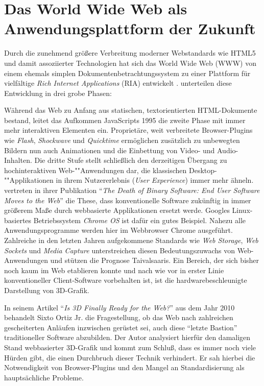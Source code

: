 \chapter{Das World Wide Web als Anwendungsplattform der Zukunft}
\label{CHAP:INTRODUCTION}

Durch die zunehmend größere Verbreitung moderner Webstandards wie HTML5 und damit assoziierter Technologien hat sich das World Wide Web (WWW) von einem ehemals simplen Dokumentenbetrachtungssystem zu einer Plattform für vielfältige \emph{Rich Internet Applications} (RIA) entwickelt \autocite{Taivalsaari:2001:Saga_continues}. \textcite{Anttonen:2011:TWR:1982185.1982357} unterteilen diese Entwicklung in drei grobe Phasen:

Während das Web zu Anfang aus statischen, textorientierten HTML-Dokumente bestand, leitet das Aufkommen JavaScripts 1995 die zweite Phase mit immer mehr interaktiven Elementen ein. Proprietäre, weit verbreitete Browser-Plugins wie \emph{Flash}, \emph{Shockwave} und \emph{Quicktime} ermöglichen zusätzlich zu unbewegten Bildern nun auch Animationen und die Einbettung von Video- und Audio-Inhalten.\newline
Die dritte Stufe stellt schließlich den derzeitigen Übergang zu hochinteraktiven Web-""Anwendungen dar, die klassischen Desktop-""Applikationen in ihrem Nutzererlebnis (\emph{User Experience}) immer mehr ähneln.
\textcite{Taivalsaari:2011:Death_of_Binary_Software} vertreten in ihrer Publikation \enquote{\emph{The Death of Binary Software: End User Software Moves to the Web}} die These, dass konventionelle Software zukünftig in immer größerem Maße durch webbasierte Applikationen ersetzt werde. Googles Linux-basiertes Betriebssystem \emph{Chrome OS} ist dafür ein gutes Beispiel. Nahezu alle Anwendungsprogramme werden hier im Webbrowser Chrome ausgeführt.
Zahlreiche in den letzten Jahren aufgekommene Standards wie \emph{Web Storage}, \emph{Web Sockets} und \emph{Media Capture} unterstreichen diesen Bedeutungszuwachs von Web-Anwendungen und stützen die Prognose Taivalsaaris. Ein Bereich, der sich bisher noch kaum im Web etablieren konnte und nach wie vor in erster Linie konventioneller Client-Software vorbehalten ist, ist die hardwarebeschleunigte Darstellung von 3D-Grafik.

In seinem Artikel \enquote{\emph{Is 3D Finally Ready for the Web?}} aus dem Jahr 2010 behandelt Sixto Ortiz Jr. die Fragestellung, ob das Web nach zahlreichen gescheiterten Anläufen inzwischen gerüstet sei, auch diese \enquote{letzte Bastion} \autocite{Taivalsaari:2011:Death_of_Binary_Software} traditioneller Software abzubilden. Der Autor analysiert hierfür den damaligen Stand webbasierter 3D-Grafik und kommt zum Schluß, dass es immer noch viele Hürden gibt, die einen Durchbruch dieser Technik verhindert. Er sah hierbei die Notwendigkeit von Browser-Plugins und den Mangel an Standardisierung als hauptsächliche Probleme.